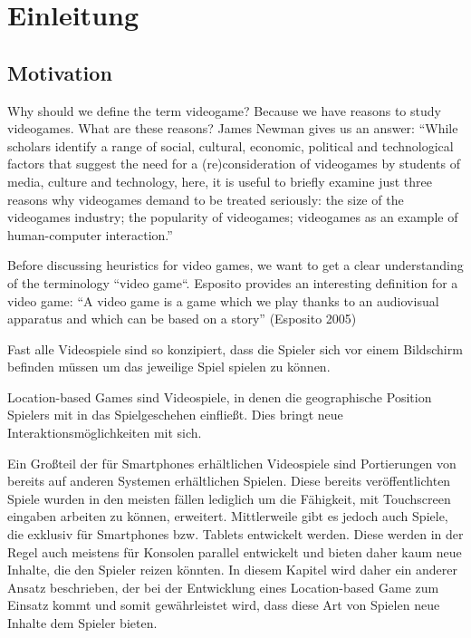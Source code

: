 \chapter{Einleitung}
\label{cha:einleitung}

\section{Motivation}
\label{sec:motivation}
 
Why should we define the term videogame? Because we have reasons to study videogames. What are these reasons? James Newman gives us an answer:
“While scholars identify a range of social, cultural, economic, political and technological factors that suggest the need for a (re)consideration of videogames by students of media, culture and technology, here, it is useful to briefly examine just three reasons why videogames demand to be treated seriously: the size of the videogames industry; the popularity of videogames; videogames as an example of human-computer interaction.” 


Before discussing heuristics for video games, we want to get a clear understanding of the terminology “video game“. Esposito provides an interesting definition for a video game:
“A video game is a game which we play thanks to an audiovisual apparatus and which can be based on a story” (Esposito 2005)

\cite{Nicolas:tk}

Fast alle Videospiele sind so konzipiert, dass die Spieler sich vor einem Bildschirm befinden müssen um das jeweilige Spiel spielen zu können. 

Location-based Games sind Videospiele, in denen die geographische Position Spielers mit in das Spielgeschehen einfließt.
Dies bringt neue Interaktionsmöglichkeiten mit sich. 



Ein Großteil der für Smartphones erhältlichen Videospiele sind Portierungen von bereits auf anderen Systemen erhältlichen Spielen. Diese bereits veröffentlichten Spiele wurden in den meisten fällen lediglich um die Fähigkeit, mit Touchscreen eingaben arbeiten zu können, erweitert.
Mittlerweile gibt es jedoch auch Spiele, die exklusiv für Smartphones bzw. Tablets entwickelt werden. Diese werden in der Regel auch meistens für Konsolen parallel entwickelt und bieten daher kaum neue Inhalte, die den Spieler reizen könnten. In diesem Kapitel wird daher ein anderer Ansatz beschrieben, der bei der Entwicklung eines Location-based Game zum Einsatz kommt und somit gewährleistet wird, dass diese Art von Spielen neue Inhalte dem Spieler bieten.

